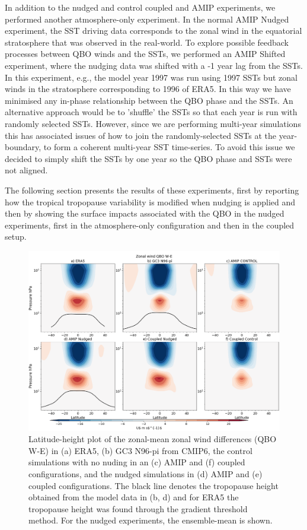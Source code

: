 In addition to the nudged and control coupled and AMIP experiments, we performed another atmosphere-only experiment. In the normal AMIP Nudged experiment, the SST driving data corresponds to the zonal wind in the equatorial stratosphere that was observed in the real-world. To explore possible feedback processes between QBO winds and the SSTs, we performed an AMIP Shifted experiment, where the nudging data was shifted with a -1 year lag from the SSTs. In this experiment, e.g., the model year 1997 was run using 1997 SSTs but zonal winds in the stratosphere corresponding to 1996 of ERA5. In this way we have minimised any in-phase relationship between the QBO phase and the SSTs. An alternative approach would be to 'shuffle' the SSTs so that each year is run with randomly selected SSTs. However, since we are performing multi-year simulations this has associated issues of how to join the randomly-selected SSTs at the year-boundary, to form a coherent multi-year SST time-series. To avoid this issue we decided to simply shift the SSTs by one year so the QBO phase and SSTs were not aligned.  

The following section presents the results of these experiments, first by reporting how the tropical tropopause variability is modified when nudging is applied and then by showing the surface impacts associated with the QBO in the nudged experiments, first in the atmosphere-only configuration and then in the coupled setup.

\begin{figure}[t!]
\centering
 \includegraphics[width=\linewidth]{figures/zonalplotx_wind.png}
\caption[Zonal mean zonal wind QBO difference]{Latitude-height plot of the zonal-mean zonal wind differences (QBO W-E) in (a) ERA5, (b) GC3 N96-pi from CMIP6, the control simulations with no nuding in an (c) AMIP and (f) coupled configurations, and the nudged simulations in (d) AMIP and (e) coupled configurations. The black line denotes the tropopause height obtained from the model data in (b, d) and for ERA5 the tropopause height was found through the gradient threshold method. For the nudged experiments, the ensemble-mean is shown. }
\label{fig:zonal_u}
\end{figure}

